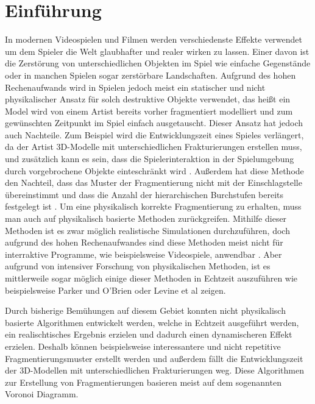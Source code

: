 \chapter{Einführung}

In modernen Videospielen und Filmen werden verschiedenste Effekte verwendet um dem Spieler die Welt glaubhafter und realer wirken zu lassen.
Einer davon ist die Zerstörung von unterschiedlichen Objekten im Spiel wie einfache Gegenstände oder in manchen Spielen sogar zerstörbare Landschaften.
Aufgrund des hohen Rechenaufwands wird in Spielen jedoch meist ein statischer und nicht physikalischer Ansatz für solch destruktive Objekte verwendet, 
das heißt ein Model wird von einem Artist bereits vorher fragmentiert modelliert und zum gewünschten Zeitpunkt im Spiel einfach ausgetauscht. 
Dieser Ansatz hat jedoch auch Nachteile. Zum Beispiel wird die Entwicklungszeit eines Spieles verlängert, da der Artist 3D-Modelle mit 
unterschiedlichen Frakturierungen erstellen muss, und zusätzlich kann es sein, dass die Spielerinteraktion in der Spielumgebung durch 
vorgebrochene Objekte einteschränkt wird \cite{Najim.DynamicFracturing}.
Außerdem hat diese Methode den Nachteil, dass das Muster der Fragmentierung nicht mit der Einschlagstelle übereinstimmt und dass die Anzahl der 
hierarchischen Burchstufen bereits festgelegt ist \cite{Mueller.RealTimeDynamicFractureVACD}. Um eine physikalisch korrekte Fragmentierung zu erhalten, muss man 
auch auf physikalisch basierte Methoden zurückgreifen. Mithilfe dieser Methoden ist es zwar möglich realistische Simulationen durchzuführen, doch aufgrund des hohen
Rechenaufwandes sind diese Methoden meist nicht für interraktive Programme, wie beispielsweise Videospiele, anwendbar \cite{Torres.FractureModelingSurvey}.
Aber aufgrund von intensiver Forschung von physikalischen Methoden, ist es mittlerweile sogar möglich einige dieser Methoden in Echtzeit auszuführen wie beispielsweise
Parker und O'Brien \cite{Parker.Real-TimeDeformation} oder Levine et al \cite{Levine.PeridynamicSpringMass} zeigen.

Durch bisherige Bemühungen auf diesem Gebiet konnten nicht physikalisch basierte Algorithmen entwickelt werden, welche in Echtzeit ausgeführt werden, ein 
realischtisches Ergebnis erzielen und dadurch einen dynamischeren Effekt erzielen. 
Deshalb können beispielsweise interessantere und nicht repetitive Fragmentierungsmuster erstellt werden und außerdem fällt die 
Entwicklungszeit der 3D-Modellen mit unterschiedlichen Frakturierungen weg.
Diese Algorithmen zur Erstellung von Fragmentierungen basieren meist auf dem sogenannten Voronoi Diagramm.